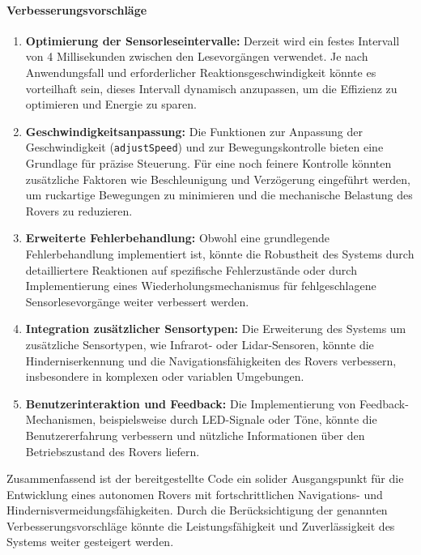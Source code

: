 \documentclass{vorlage-design-main}
\begin{document}
\hypertarget{verbesserungsvorschluxe4ge}{%
\paragraph{Verbesserungsvorschläge}\label{verbesserungsvorschlaege}}

\begin{enumerate}
\def\labelenumi{\arabic{enumi}.}
\item
  \textbf{Optimierung der Sensorleseintervalle:} Derzeit wird ein festes
  Intervall von 4 Millisekunden zwischen den Lesevorgängen verwendet. Je
  nach Anwendungsfall und erforderlicher Reaktionsgeschwindigkeit könnte
  es vorteilhaft sein, dieses Intervall dynamisch anzupassen, um die
  Effizienz zu optimieren und Energie zu sparen.
\item
  \textbf{Geschwindigkeitsanpassung:} Die Funktionen zur Anpassung der
  Geschwindigkeit (\verb|adjustSpeed|) und zur
  Bewegungskontrolle bieten eine Grundlage für präzise Steuerung. Für
  eine noch feinere Kontrolle könnten zusätzliche Faktoren wie
  Beschleunigung und Verzögerung eingeführt werden, um ruckartige
  Bewegungen zu minimieren und die mechanische Belastung des Rovers zu
  reduzieren.
\item
  \textbf{Erweiterte Fehlerbehandlung:} Obwohl eine grundlegende
  Fehlerbehandlung implementiert ist, könnte die Robustheit des Systems
  durch detailliertere Reaktionen auf spezifische Fehlerzustände oder
  durch Implementierung eines Wiederholungsmechanismus für
  fehlgeschlagene Sensorlesevorgänge weiter verbessert werden.
\item
  \textbf{Integration zusätzlicher Sensortypen:} Die Erweiterung des
  Systems um zusätzliche Sensortypen, wie Infrarot- oder Lidar-Sensoren,
  könnte die Hinderniserkennung und die Navigationsfähigkeiten des
  Rovers verbessern, insbesondere in komplexen oder variablen
  Umgebungen.
\item
  \textbf{Benutzerinteraktion und Feedback:} Die Implementierung von
  Feedback-Mechanismen, beispielsweise durch LED-Signale oder Töne,
  könnte die Benutzererfahrung verbessern und nützliche Informationen
  über den Betriebszustand des Rovers liefern.
\end{enumerate}

Zusammenfassend ist der bereitgestellte Code ein solider Ausgangspunkt
für die Entwicklung eines autonomen Rovers mit fortschrittlichen
Navigations- und Hindernisvermeidungsfähigkeiten. Durch die
Berücksichtigung der genannten Verbesserungsvorschläge könnte die
Leistungsfähigkeit und Zuverlässigkeit des Systems weiter gesteigert
werden.
\end{document}

